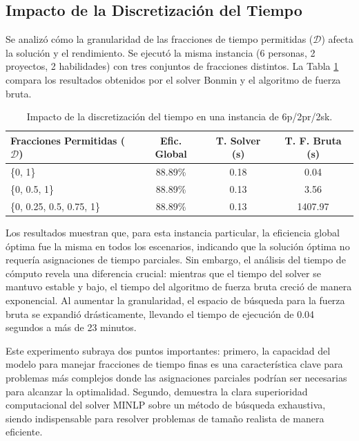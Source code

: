 \documentclass[conference]{IEEEtran}
\begin{document}
\subsection{Impacto de la Discretización del Tiempo}
Se analizó cómo la granularidad de las fracciones de tiempo permitidas (\(\mathcal{D}\)) afecta la solución y el rendimiento. Se ejecutó la misma instancia (6 personas, 2 proyectos, 2 habilidades) con tres conjuntos de fracciones distintos. La Tabla \ref{tab:discretizacion} compara los resultados obtenidos por el solver Bonmin y el algoritmo de fuerza bruta.

\begin{table}[htbp]
    \centering
    \caption{Impacto de la discretización del tiempo en una instancia de 6p/2pr/2sk.}
    \label{tab:discretizacion}
    \begin{tabularx}{\linewidth}{@{}lccc@{}}
        \toprule
        \textbf{Fracciones Permitidas (\(\mathcal{D}\))} & \textbf{Efic. Global} & \textbf{T. Solver (s)} & \textbf{T. F. Bruta (s)} \\
        \midrule
        \{0, 1\}                                         & 88.89\%               & 0.18                   & 0.04                     \\
        \{0, 0.5, 1\}                                    & 88.89\%               & 0.13                   & 3.56                     \\
        \{0, 0.25, 0.5, 0.75, 1\}                        & 88.89\%               & 0.13                   & 1407.97                  \\
        \bottomrule
    \end{tabularx}
\end{table}

Los resultados muestran que, para esta instancia particular, la eficiencia global óptima fue la misma en todos los escenarios, indicando que la solución óptima no requería asignaciones de tiempo parciales. Sin embargo, el análisis del tiempo de cómputo revela una diferencia crucial: mientras que el tiempo del solver se mantuvo estable y bajo, el tiempo del algoritmo de fuerza bruta creció de manera exponencial. Al aumentar la granularidad, el espacio de búsqueda para la fuerza bruta se expandió drásticamente, llevando el tiempo de ejecución de 0.04 segundos a más de 23 minutos.

Este experimento subraya dos puntos importantes: primero, la capacidad del modelo para manejar fracciones de tiempo finas es una característica clave para problemas más complejos donde las asignaciones parciales podrían ser necesarias para alcanzar la optimalidad. Segundo, demuestra la clara superioridad computacional del solver MINLP sobre un método de búsqueda exhaustiva, siendo indispensable para resolver problemas de tamaño realista de manera eficiente.
\end{document}
